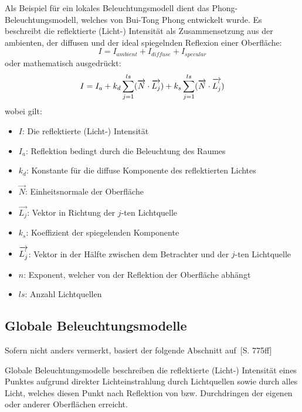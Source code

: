 Als Beispiel für ein lokales Beleuchtungsmodell dient das Phong-Beleuchtungsmodell, welches von Bui-Tong Phong entwickelt wurde.
Es beschreibt die reflektierte (Licht-) Intensität als Zusammensetzung aus der ambienten, der diffusen und der ideal spiegelnden Reflexion einer Oberfläche:
\begin{equation}
    I = I_{ambient} + I_{diffuse} + I_{specular}
\end{equation}
oder mathematisch ausgedrückt:
\begin{equation}
    I = I_a + k_d \displaystyle\sum_{j=1}^{ls} (\overrightarrow{N} \cdot \overrightarrow{L_j}) + k_s \displaystyle\sum_{j=1}^{ls} (\overrightarrow{N} \cdot \overrightarrow{L_j^`} )
\end{equation}
wobei gilt:
\begin{itemize}
    \item $I$:                      Die reflektierte (Licht-) Intensität
    \item $I_a$:                    Reflektion bedingt durch die Beleuchtung des Raumes
    \item $k_d$:                    Konstante für die diffuse Komponente des reflektierten Lichtes
    \item $\overrightarrow{N}$:     Einheitsnormale der Oberfläche
    \item $\overrightarrow{L_j}$:   Vektor in Richtung der $j$-ten Lichtquelle
    \item $k_s$:                    Koeffizient der spiegelenden Komponente
    \item $\overrightarrow{L_j^`}$: Vektor in der Hälfte zwischen dem Betrachter und der $j$-ten Lichtquelle
    \item $n$:                      Exponent, welcher von der Reflektion der Oberfläche abhängt
    \item $ls$:                     Anzahl Lichtquellen
\end{itemize}

\subsection{Globale Beleuchtungsmodelle}
\label{subsec:global_illumination_models}

Sofern nicht anders vermerkt, basiert der folgende Abschnitt auf~\cite{foley_computer_1996}[S. 775ff]

Globale Beleuchtungsmodelle beschreiben die reflektierte (Licht-) Intensität eines Punktes aufgrund direkter Lichteinstrahlung durch Lichtquellen sowie durch alles Licht, welches diesen Punkt nach Reflektion von bzw. Durchdringen der eigenen oder anderer Oberflächen erreicht.

